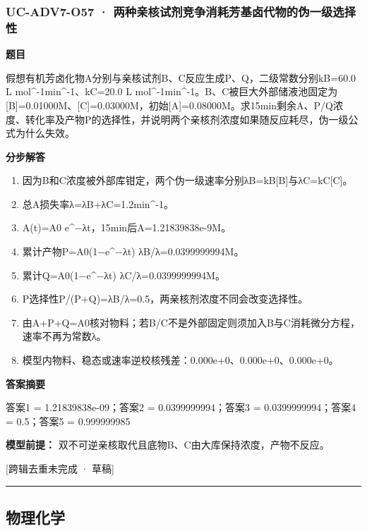 \documentclass[UTF8,11pt,a4paper]{ctexart}
\begin{document}
\subsubsection*{UC-ADV7-O57 · 两种亲核试剂竞争消耗芳基卤代物的伪一级选择性}
\noindent\textbf{题目}\par
假想有机芳卤化物A分别与亲核试剂B、C反应生成P、Q，二级常数分别kB=60.0 L mol\textasciicircum{}-1min\textasciicircum{}-1、kC=20.0 L mol\textasciicircum{}-1min\textasciicircum{}-1。B、C被巨大外部储液池固定为[B]=0.01000M、[C]=0.03000M，初始[A]=0.08000M。求15min剩余A、P/Q浓度、转化率及产物P的选择性，并说明两个亲核剂浓度如果随反应耗尽，伪一级公式为什么失效。\par
\medskip\noindent\textbf{分步解答}
\begin{enumerate}
\item 因为B和C浓度被外部库钳定，两个伪一级速率分别λB=kB[B]与λC=kC[C]。
\item 总A损失率λ=λB+λC=1.2min\textasciicircum{}-1。
\item A(t)=A0 e\textasciicircum{}−λt，15min后A=1.21839838e-9M。
\item 累计产物P=A0(1−e\textasciicircum{}−λt) λB/λ=0.0399999994M。
\item 累计Q=A0(1−e\textasciicircum{}−λt) λC/λ=0.0399999994M。
\item P选择性P/(P+Q)=λB/λ=0.5，两亲核剂浓度不同会改变选择性。
\item 由A+P+Q=A0核对物料；若B/C不是外部固定则须加入B与C消耗微分方程，速率不再为常数λ。
\item 模型内物料、稳态或速率逆校核残差：0.000e+0、0.000e+0、0.000e+0。
\end{enumerate}
\noindent\textbf{答案摘要}\par
答案1 = 1.21839838e-09；答案2 = 0.0399999994；答案3 = 0.0399999994；答案4 = 0.5；答案5 = 0.999999985\par
\noindent\textbf{模型前提：}
双不可逆亲核取代且底物B、C由大库保持浓度，产物不反应。\par
\noindent\textcolor{red!65!black}{[跨辑去重未完成 · 草稿]} \par
\medskip\hrule\medskip
\subsection*{物理化学}
\end{document}

